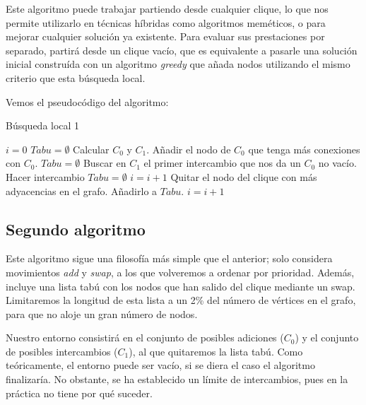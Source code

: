 Este algoritmo puede trabajar partiendo desde cualquier clique, lo que nos permite utilizarlo en técnicas
híbridas como algoritmos meméticos, o para mejorar cualquier solución ya existente. Para evaluar
sus prestaciones por separado, partirá desde un clique vacío, que es equivalente a pasarle una solución
inicial construída con un algoritmo \textit{greedy} que añada nodos utilizando el mismo criterio que esta
búsqueda local.

Vemos el pseudocódigo del algoritmo:

\begin{algorithm}[H]
\caption{Búsqueda local 1}
  \begin{algorithmic}
    \State $i = 0$
    \State $Tabu = \emptyset$
    \State Calcular $C_0$ y $C_1$.
    \Repeat
        \State Añadir el nodo de $C_0$ que tenga más conexiones con $C_0$.
        \State $Tabu = \emptyset$
      \Else
        \State Buscar en $C_1$ el primer intercambio que nos da un $C_0$ no vacío.
          \State Hacer intercambio
          \State $Tabu = \emptyset$
          \State $i = i + 1$
        \Else
          \State Quitar el nodo del clique con más adyacencias en el grafo.
          \State Añadirlo a $Tabu$.
          \State $i = i + 1$
        \EndIf
      \EndIf
  \end{algorithmic}
\end{algorithm}

\subsection{Segundo algoritmo}

Este algoritmo sigue una filosofía más simple que el anterior; solo considera movimientos
\textit{add} y \textit{swap}, a los que volveremos a ordenar por prioridad. Además, incluye una
lista tabú con los nodos que han salido del clique mediante un swap. Limitaremos la longitud de
esta lista a un 2\% del número de vértices en el grafo, para que no aloje un gran número de nodos.

Nuestro entorno consistirá en el conjunto de posibles adiciones ($C_0$) y el conjunto de
posibles intercambios ($C_1$), al que quitaremos la lista tabú. Como teóricamente, el entorno
puede ser vacío, si se diera el caso el algoritmo finalizaría. No obstante, se ha establecido un
límite de intercambios, pues en la práctica no tiene por qué suceder.


